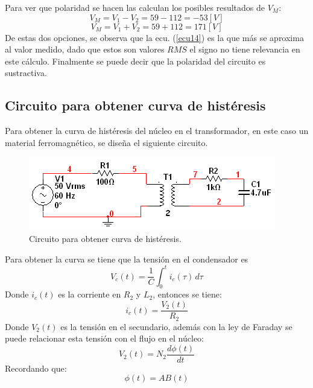 \documentclass[twocolumn]{IEEEtran}
\begin{document}
\noindent
Para ver que polaridad se hacen las calculan los posibles resultados de $V_M$:
\begin{equation}
{V_M}=V_1-V_2=59-112=-53[V]
\label{ecu14}
\end{equation}
\begin{equation}
{V_M}=V_1+V_2=59+112=171 [V]
\label{ecu15}
\end{equation}
\noindent
De estas dos opciones, se observa que la ecu. (\ref {ecu14}) es la que más se aproxima al valor medido, dado que estos son valores $RMS$ el signo no tiene relevancia  en este cálculo. Finalmente se puede decir que la polaridad del circuito es sustractiva.

\subsection{Circuito para obtener curva de histéresis}
Para obtener la curva de histéresis del núcleo en el transformador, en este caso un material ferromagnético, se diseña el siguiente circuito.
\begin{figure}[H]
	\centering
		\includegraphics[scale=0.6]{circ2.PNG}
	\caption{Circuito para obtener curva de histéresis.}
	\label{fig11}
\end{figure}
\noindent
Para obtener la curva se tiene que la tensión en el condensador es
\begin{equation}
V_c(t)=\frac{1}{C}\displaystyle\int_{0}^{t} i_c(\tau)\, d\tau
\label{ecu32}
\end{equation}
\noindent
Donde $i_c(t)$ es la corriente en $R_2$ y $L_2$, entonces se tiene:
\begin{equation}
i_c(t)=\frac{V_2(t)}{R_2}
\label{ecu33}
\end{equation}
\noindent
Donde $V_2(t)$ es la tensión en el secundario, además con la ley de Faraday se puede relacionar esta tensión con el flujo en el núcleo:
\begin{equation}
V_2(t)=N_2\frac{d \phi(t)}{dt}
\label{ecu34}
\end{equation}
\noindent
Recordando que:
\begin{equation}
\phi(t)=A B(t)
\label{ecu35}
\end{equation}
\end{document}
